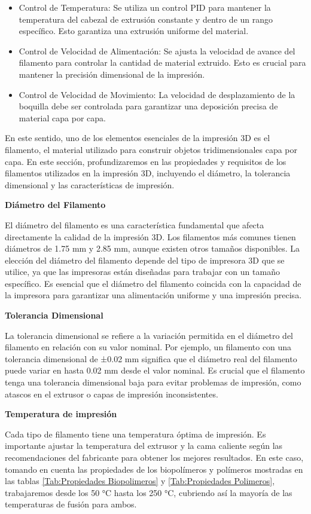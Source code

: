 \documentclass[14pt,oneside]{extarticle} %
\begin{document}
\begin{itemize}
    \item Control de Temperatura: Se utiliza un control PID para mantener la temperatura del cabezal de extrusión constante y dentro de un rango específico. Esto garantiza una extrusión uniforme del material.
    \item Control de Velocidad de Alimentación: Se ajusta la velocidad de avance del filamento para controlar la cantidad de material extruido. Esto es crucial para mantener la precisión dimensional de la impresión.
    \item Control de Velocidad de Movimiento: La velocidad de desplazamiento de la boquilla debe ser controlada para garantizar una deposición precisa de material capa por capa.
\end{itemize}

En este sentido, uno de los elementos esenciales de la impresión 3D es el filamento, el material utilizado para construir objetos tridimensionales capa por capa. En este sección, profundizaremos en las propiedades y requisitos de los filamentos utilizados en la impresión 3D, incluyendo el diámetro, la tolerancia dimensional y las características de impresión.

\newpage
\textbf{Diámetro del Filamento}

El diámetro del filamento es una característica fundamental que afecta directamente la calidad de la impresión 3D. Los filamentos más comunes tienen diámetros de 1.75 mm y 2.85 mm, aunque existen otros tamaños disponibles. La elección del diámetro del filamento depende del tipo de impresora 3D que se utilice, ya que las impresoras están diseñadas para trabajar con un tamaño específico. Es esencial que el diámetro del filamento coincida con la capacidad de la impresora para garantizar una alimentación uniforme y una impresión precisa.

\textbf{Tolerancia Dimensional} 

La tolerancia dimensional se refiere a la variación permitida en el diámetro del filamento en relación con su valor nominal. Por ejemplo, un filamento con una tolerancia dimensional de ±0.02 mm significa que el diámetro real del filamento puede variar en hasta 0.02 mm desde el valor nominal. Es crucial que el filamento tenga una tolerancia dimensional baja para evitar problemas de impresión, como atascos en el extrusor o capas de impresión inconsistentes.

\textbf{Temperatura de impresión}

Cada tipo de filamento tiene una temperatura óptima de impresión. Es importante ajustar la temperatura del extrusor y la cama caliente según las recomendaciones del fabricante para obtener los mejores resultados. En este caso, tomando en cuenta las propiedades de los biopolímeros y polímeros mostradas en las tablas \ref{Tab:Propiedades Biopolimeros} y \ref{Tab:Propiedades Polimeros}, trabajaremos desde los 50 °C hasta los 250 °C, cubriendo así la mayoría de las temperaturas de fusión para ambos.
\end{document}
